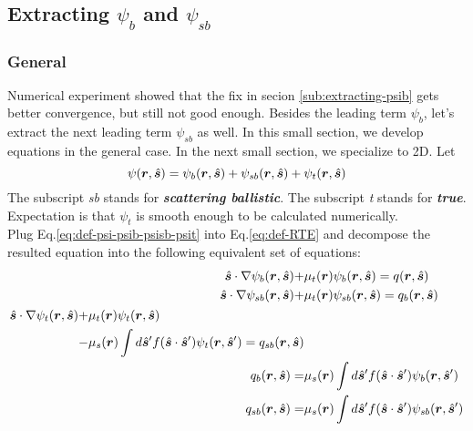 \documentclass [10pt,letterpaper]{article}
\renewcommand{\vec}{\vectorsym}
\newcommand{\unitvec}[1]{\hat{\vec{#1}}}
\newcommand{\grad}{\nabla}
\begin{document}
\subsection{Extracting $\psi_b$ and $\psi_{sb}$}
\label{sub:extracting-psib-and-psisb}
\subsubsection{General}
\label{subsub:extracting-psib-psisb-general}
Numerical experiment showed that the fix in secion \ref{sub:extracting-psib} gets better convergence, but still not good enough.
Besides the leading term $\psi_b$, let's extract the next leading term $\psi_{sb}$ as well.
In this small section, we develop equations in the general case.
In the next small section, we specialize to 2D.
Let
\begin{equation} \label{eq:def-psi-psib-psisb-psit} 
	\psi(\vec{r},\unitvec{s})
	= 
	\psi_b(\vec{r},\unitvec{s})
	+
	\psi_{sb}(\vec{r},\unitvec{s})
	+
	\psi_t(\vec{r},\unitvec{s})
\end{equation}
The subscript \emph{sb} stands for \emph{\bf scattering ballistic}.
The subscript \emph{t} stands for \emph{\bf true}.
Expectation is that $\psi_t$ is smooth enough to be calculated numerically.
\\
Plug Eq.\eqref{eq:def-psi-psib-psisb-psit} into Eq.\eqref{eq:def-RTE} and decompose the resulted equation into the following equivalent set of equations:
\begin{subequations} \label{eq:def-psi-2ndtime-psisb-psit-general-qb-2ndtime-qsb-general}
	\begin{align}
		\unitvec{s} \cdot \grad
		\psi_b(\vec{r},\unitvec{s})
		+&
		\mu_t(\vec{r})
		\psi_b(\vec{r},\unitvec{s})
		=
		q(\vec{r},\unitvec{s}) 
		\label{eq:def-psib-general-2ndtime}
		\\ 
		\unitvec{s} \cdot \grad
		\psi_{sb}(\vec{r},\unitvec{s})
		+&
		\mu_t(\vec{r})
		\psi_{sb}(\vec{r},\unitvec{s})
		=
		q_b(\vec{r},\unitvec{s}) 
		\label{eq:def-psisb-general}
		\\
		\begin{split}
			\unitvec{s} \cdot \grad
			\psi_t(\vec{r},\unitvec{s})
			+&
			\mu_t(\vec{r})
			\psi_t(\vec{r},\unitvec{s})
			\\
			-&
			\mu_s(\vec{r})
			\int d\unitvec{s}^\prime
			f(\unitvec{s} \cdot \unitvec{s}^\prime)
			\psi_t(\vec{r},\unitvec{s}^\prime)
			=
			q_{sb}(\vec{r},\unitvec{s}) 
		\end{split}
		\label{eq:def-psit-general} 
		\\
		q_b(\vec{r},\unitvec{s})
		=&
		\mu_s(\vec{r})
		\int d\unitvec{s}^\prime
		f(\unitvec{s} \cdot \unitvec{s}^\prime)
		\psi_b(\vec{r},\unitvec{s}^\prime)
		\label{eq:def-qb-general-2ndtime}
		\\ 
		q_{sb}(\vec{r},\unitvec{s})
		=&
		\mu_s(\vec{r})
		\int d\unitvec{s}^\prime
		f(\unitvec{s} \cdot \unitvec{s}^\prime)
		\psi_{sb}(\vec{r},\unitvec{s}^\prime)
		\label{eq:def-qsb-general}
	\end{align}
\end{subequations}
\end{document}
